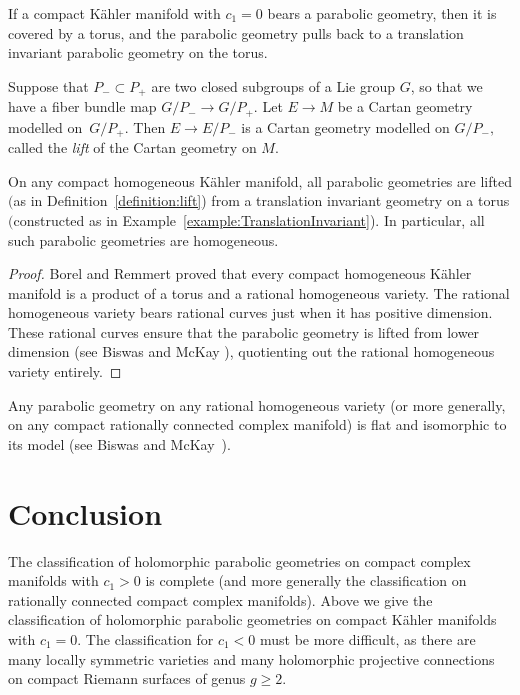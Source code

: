 \documentclass[pdftex]{sigma}
\newcommand{\Gtot}{\ensuremath{G}}
\newcommand{\Gstruc}{P}
\begin{document}
\begin{corollary}
If a compact K\"ahler manifold with $c_1=0$ bears a parabolic
geometry, then it is covered by a torus, and the parabolic geometry
pulls back to a translation invariant parabolic geometry on the
torus.
\end{corollary}

\begin{definition}\label{definition:lift}
Suppose that $\Gstruc_- \subset \Gstruc_+$ are two closed subgroups
of a Lie group $\Gtot$, so that we have a f\/iber bundle map
$\Gtot/\Gstruc_- \to \Gtot/\Gstruc_+$. Let $E \to M$ be a Cartan geometry modelled on~$\Gtot/\Gstruc_+$. Then $E \to E/\Gstruc_-$ is a Cartan geometry
modelled on $\Gtot/\Gstruc_-,$ called the \emph{lift} of the Cartan
geometry on $M$.
\end{definition}

\begin{corollary}
On any compact homogeneous K\"ahler manifold, all parabolic
geometries are lifted $($as in Definition~{\rm \ref{definition:lift})} from a
translation invariant geometry on a torus $($constructed as in
Example~{\rm \ref{example:TranslationInvariant})}. In particular, all
such parabolic geometries are homogeneous.
\end{corollary}

\begin{proof}
Borel and Remmert \cite{Borel/Remmert:1961} proved that every compact
homogeneous K\"ahler manifold is a product of a torus and a rational
homogeneous variety. The rational homogeneous variety bears rational
curves just when it has positive dimension. These rational curves
ensure that the parabolic geometry is lifted from lower dimension
(see Biswas and McKay \cite{Biswas/McKay:2010c}), quotienting out the rational
homogeneous variety entirely.
\end{proof}

\begin{remark}
Any parabolic geometry on any rational homogeneous variety
(or more generally, on any compact rationally connected complex
manifold) is f\/lat and isomorphic to its model
(see Biswas and McKay~\cite{Biswas/McKay:2010c}).
\end{remark}

\section{Conclusion}

The classif\/ication of holomorphic parabolic geometries
on compact complex manifolds with \mbox{$c_1>0$} is complete \cite{Biswas/McKay:2010c}
(and more generally the classif\/ication on rationally connected
compact complex manifolds).
Above we give the classif\/ication of holomorphic parabolic geometries
on compact K{\"a}hler manifolds with $c_1=0$. The classif\/ication for
$c_1<0$ must be more dif\/f\/icult, as there are many locally
symmetric varieties and many holomorphic projective connections
on compact Riemann surfaces of genus $g \ge 2$.
\end{document}
